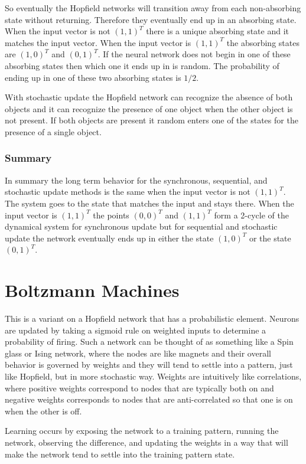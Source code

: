    So eventually the Hopfield networks will transition away from each 
non-absorbing state without returning.  Therefore they eventually end up in an 
absorbing state.  When the input vector is not $(1,1)^T$ there is a unique 
absorbing state and it matches the input vector.  When the input vector is 
$(1,1)^T$ the absorbing states are $(1,0)^T$ and $(0,1)^T$.  If the neural 
network does not begin in one of these absorbing states then which one it ends 
up in is random.  The probability of ending up in one of these two absorbing 
states is $1/2$.

  With stochastic update the Hopfield network can recognize the absence of
both objects and it can recognize the presence of one object when the other
object is not present.  If both objects are present it random enters one of the
states for the presence of a single object.

\subsubsection{Summary}

   In summary the long term behavior for the synchronous, sequential, and 
stochastic update methods is the same when the input vector is not $(1,1)^T$.  
The system goes to the state that matches the input and stays there.  When the 
input vector is $(1,1)^T$ the points $(0,0)^T$ and $(1,1)^T$ form a 2-cycle of 
the dynamical system for synchronous update but for sequential and stochastic 
update the network eventually ends up in either the state $(1,0)^T$ or the 
state $(0,1)^T$.

\section{Boltzmann Machines}

This is a variant on a Hopfield network that has a probabilistic element. Neurons are updated by taking a sigmoid rule on weighted inputs to determine a probability of firing.  Such a network can be thought of as something like a Spin glass or Ising network, where the nodes are like magnets and their overall behavior is governed by weights and they will tend to settle into a pattern, just like Hopfield, but in more stochastic way.  Weights are intuitively like correlations, where positive weights correspond to nodes that are typically both on and negative weights corresponds to nodes that are anti-correlated so that one is on when the other is off.

Learning occurs by exposing the network to a training pattern, running the network, observing the difference, and updating the weights in a way that will make the network tend to settle into the training pattern state.

